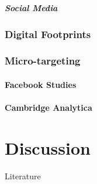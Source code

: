 \begin{frame}
    \frametitle{Social Media}
\end{frame}

\section[Digital Footprints]{Digital Footprints}

\section[Micro-targeting]{Micro-targeting}

\subsection[Facebook Studies]{Facebook Studies}

\subsection[Cambridge Analytica]{Cambridge Analytica}

\part[Discussion]{Discussion}
\frame{\partpage}


\begin{frame}{Literature}
\nocite{*}
\AtNextBibliography{\footnotesize}
\printbibliography
\end{frame}
